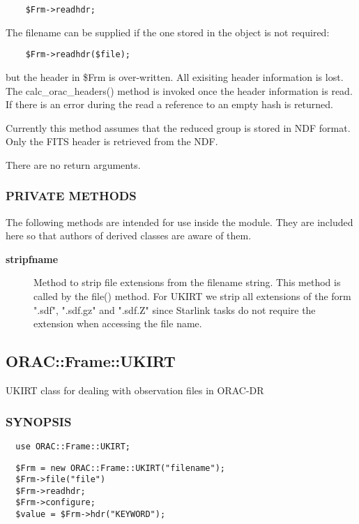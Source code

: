 \begin{description}
\begin{verbatim}
    $Frm->readhdr;
\end{verbatim}


The filename can be supplied if the one stored in the object
is not required:

\begin{verbatim}
    $Frm->readhdr($file);
\end{verbatim}


but the header in \$Frm is over-written.
All exisiting header information is lost. The calc\_orac\_headers()
method is invoked once the header information is read.
If there is an error during the read a reference to an empty hash is 
returned.



Currently this method assumes that the reduced group is stored in
NDF format. Only the FITS header is retrieved from the NDF.



There are no return arguments.

\end{description}
\subsubsection*{PRIVATE METHODS\label{ORAC::Frame::NDF_PRIVATE_METHODS}}

The following methods are intended for use inside the module.
They are included here so that authors of derived classes are 
aware of them.

\begin{description}
\item[\textbf{stripfname}] \mbox{}

Method to strip file extensions from the filename string. This method
is called by the file() method. For UKIRT we strip all extensions of the
form ".sdf", ".sdf.gz" and ".sdf.Z" since Starlink tasks do not require
the extension when accessing the file name.

\end{description}

\subsection{ORAC::Frame::UKIRT\label{ORAC::Frame::UKIRT}}

UKIRT class for dealing with observation files in ORAC-DR

\subsubsection*{SYNOPSIS\label{ORAC::Frame::UKIRT_SYNOPSIS}}\begin{verbatim}
  use ORAC::Frame::UKIRT;
\end{verbatim}
\begin{verbatim}
  $Frm = new ORAC::Frame::UKIRT("filename");
  $Frm->file("file")
  $Frm->readhdr;
  $Frm->configure;
  $value = $Frm->hdr("KEYWORD");
\end{verbatim}
